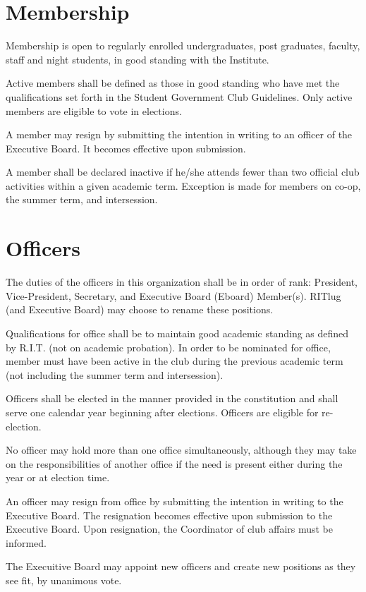 \section{Membership}
\begin{subroutines}
\item Membership is open to regularly enrolled undergraduates, post graduates, faculty, staff and night students, in good standing with the Institute.
\item Active members shall be defined as those in good standing who have met the qualifications set forth in the Student Government Club Guidelines. Only active members are eligible to vote in elections.
\item A member may resign by submitting the intention in writing to an officer of the Executive Board. It becomes effective upon submission.
\item A member shall be declared inactive if he/she attends fewer than two official club activities within a given academic term. Exception is made for members on co-op, the summer term, and intersession.
\end{subroutines}

\section{Officers}
\begin{subroutines}
\item The duties of the officers in this organization shall be in order of rank: President, Vice-President, Secretary, and Executive Board (Eboard) Member(s). RITlug (and Executive Board) may choose to rename these positions.
\item Qualifications for office shall be to maintain good academic standing as defined by R.I.T. (not on academic probation). In order to be nominated for office, member must have been active in the club during the previous academic term (not including the summer term and intersession).
\item Officers shall be elected in the manner provided in the constitution and shall serve one calendar year beginning after elections. Officers are eligible for re-election.
\item No officer may hold more than one office simultaneously, although they may take on the responsibilities of another office if the need is present either during the year or at election time.
\item An officer may resign from office by submitting the intention in writing to the Executive Board. The resignation becomes effective upon submission to the Executive Board. Upon resignation, the Coordinator of club affairs must be informed.
\item The Execuitive Board may appoint new officers and create new positions as they see fit, by unanimous vote.
\end{subroutines}

